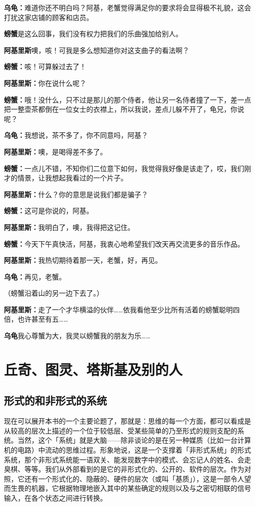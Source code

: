 \documentclass[
  12pt,
  twoside,
  openright,
  oldfontcommands,
]{memoir}
\newcommand{\dialogname}[1]{{\heifamily\bfseries #1}}
\begin{document}
\dialogname{乌龟：}难道你还不明白吗？阿基，老蟹觉得满足你的要求将会显得极不礼貌，这会打扰这家店铺的顾客和店员。

\dialogname{螃蟹}是这么回事，我们没有权力把我们的乐曲强加给别人。

\dialogname{阿基里斯}噢，咳！可我是多么想知道你对这支曲子的看法啊？

\dialogname{螃蟹：}咳！可算躲过去了！

\dialogname{阿基里斯：}你在说什么呢？

\dialogname{螃蟹：}哦！没什么，只不过是那儿的那个侍者，他让另一名侍者撞了一下，差一点把一整壶茶都倒在一位女士的衣襟上，所以我说，差点儿躲不开了，龟兄，你说呢？

\dialogname{乌龟：}我想说，茶不多了，你不同意吗，阿基？

\dialogname{阿基里斯：}噢，是喝得差不多了。

\dialogname{螃蟹：}一点儿不错，不知你们二位意下如何，我觉得我好像是该走了，哎，我们刚才的情景，让我想起我看过的一个片子。

\dialogname{阿基里斯：}什么？你的意思是说我们都是骗子？

\dialogname{螃蟹：}这可是你说的，阿基。

\dialogname{阿基里斯：}我明白了，噢，我得把这记住。

\dialogname{螃蟹：}今天下午真快活，阿基，我衷心地希望我们改天再交流更多的音乐作品。

\dialogname{阿基里斯：}我热切期待着那一天，老蟹，好，再见。

\dialogname{乌龟：}再见，老蟹。

（螃蟹沿着山的另一边下去了。）

\dialogname{阿基里斯：}走了一个才华横溢的伙伴\ldots\ldots 依我看他至少比所有活着的螃蟹聪明四倍，也许甚至有五\ldots\ldots{}

\dialogname{乌龟}我心尊蟹为大，我灵以螃蟹我的朋友为乐\ldots\ldots{}

\label{Chapter17.xhtml}{}

\chapter{丘奇、图灵、塔斯基及别的人}

\section{形式的和非形式的系统}

现在可以展开本书的一个主要论题了，那就是：思维的每一个方面，都可以看成是从较高的层次上描述的一个位于较低层、受某些简单的乃至形式的规则支配的系统。当然，这个「系统」就是大脑------除非谈论的是在另一种媒质（比如一台计算机的电路）中流动的思维过程。形象地说，这是一个支撑着「非形式系统」的形式系统，那个非形式系统能一语双关、能发现数字中的模式、会忘记人的姓名、会走臭棋、等等。我们从外部看到的是它的非形式化的、公开的、软件的层次。作为对照，它还有一个形式化的、隐蔽的、硬件的层次（或叫「基质」），这是一部令人望而生畏的机器，它根据物理地嵌入其中的某些确定的规则以及与之密切相联的信号输入，在各个状态之间进行转换。
\end{document}
